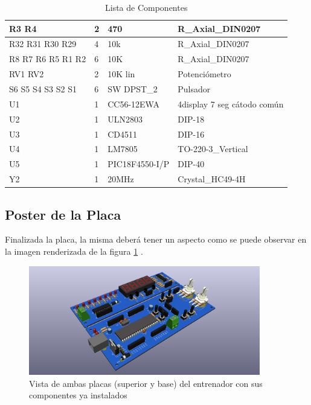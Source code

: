 \begin{table}[H]
\begin{tabular}{|p{}|p{}|p{}|p{}|}
		R3 R4 & 2 & 470 & R\_Axial\_DIN0207 \\ \hline
		R32 R31 R30 R29 & 4 & 10k & R\_Axial\_DIN0207 \\ \hline
		R8 R7 R6 R5 R1 R2 & 6 & 10K & R\_Axial\_DIN0207 \\ \hline
		RV1 RV2 & 2 & 10K lin & Potenciómetro \\ \hline
		S6 S5 S4 S3 S2 S1 & 6 & SW DPST\_2 & Pulsador \\ \hline
		U1 & 1 & CC56-12EWA & 4display 7 seg cátodo común \\ \hline
		U2 & 1 & ULN2803 & DIP-18 \\ \hline
		U3 & 1 & CD4511 & DIP-16 \\ \hline
		U4 & 1 & LM7805 & TO-220-3\_Vertical \\ \hline
		U5 & 1 & PIC18F4550-I/P & DIP-40 \\ \hline
		Y2 & 1 & 20MHz & Crystal\_HC49-4H \\ \hline
	\end{tabular}
	\caption{Lista de Componentes}
	\label{ListaComponentes}
\end{table}
\pagebreak%
\subsection{Poster de la Placa}
Finalizada la placa, la misma deberá tener un aspecto como se puede observar en la imagen renderizada de la figura \ref{posterEntrenador} .%
\begin{figure}[H]

	\centering\includegraphics[width=0.9\textwidth,clip=true]{Entrenador1-SchDoc_4Display_en_uno}

	\caption{Vista de ambas placas (superior y base) del entrenador con sus componentes ya instalados}\label{posterEntrenador}
\end{figure}



	




